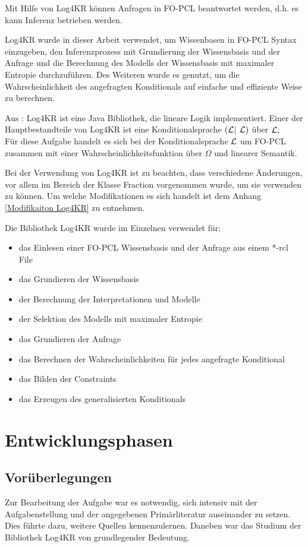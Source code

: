 \documentclass[draft]{scrreprt}
\begin{document}
Mit Hilfe von Log4KR können Anfragen in FO-PCL beantwortet werden, d.h. es kann Inferenz betrieben werden.  

Log4KR wurde in dieser Arbeit verwendet, um Wissenbasen in FO-PCL Syntax einzugeben, den Inferenzprozess mit Grundierung der Wissensbasis und der Anfrage und die Berechnung des Modells der Wissensbasis mit maximaler Entropie durchzuführen. Des Weiteren wurde es genutzt, um die Wahrscheinlichkeit des angefragten Konditionals auf einfache und effiziente Weise zu berechnen.


Aus \cite{P15}: Log4KR ist eine Java Bibliothek, die lineare Logik implementiert. Einer der Hauptbestandteile von Log4KR ist eine Konditionalsprache $ (\cal L $$ \mid $  $ \cal L )$ über $ \cal L, $ \\
Für diese Aufgabe handelt es sich bei der Konditionalsprache $ \cal L $ um FO-PCL zusammen mit einer Wahrscheinlichkeitsfunktion über $ \Omega $ und linearer Semantik. 

Bei der Verwendung von Log4KR ist zu beachten, dass verschiedene Änderungen, vor allem im Bereich der Klasse Fraction vorgenommen wurde, um sie verwenden zu können. Um welche Modifikationen es sich handelt ist dem Anhang \ref{Modifikaiton Log4KR} zu entnehmen.


Die Bibliothek Log4KR wurde im Einzelnen verwendet für:\\
\begin{itemize}
	\item das Einlesen einer FO-PCL Wissensbasis und der Anfrage aus einem *-rcl File
	\item das Grundieren der Wissensbasis
	\item der Berechnung der Interpretationen und Modelle
	\item der Selektion des Modells mit maximaler Entropie
	\item das Grundieren der Anfrage
	\item das Berechnen der Wahrscheinlichkeiten für jedes angefragte Konditional
	\item das Bilden der Constraints 
	\item das Erzeugen des generalisierten Konditionals
\end{itemize}

\section{Entwicklungsphasen}
\subsection{Vorüberlegungen}
Zur Bearbeitung der Aufgabe war es notwendig, sich intensiv mit der Aufgabenstellung und der angegebenen Primärliteratur auseinander zu setzen. Dies führte dazu, weitere Quellen kennenzulernen. Daneben war das Studium der Bibliothek Log4KR von grundlegender Bedeutung. 
\end{document}
